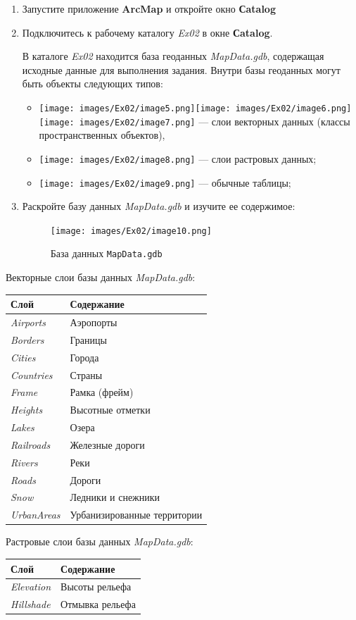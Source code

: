 \documentclass[12pt,]{book}
\providecommand{\tightlist}{%
  \setlength{\itemsep}{0pt}\setlength{\parskip}{0pt}}
\begin{document}
\begin{enumerate}
\def\labelenumi{\arabic{enumi}.}
\item
  Запустите приложение \textbf{ArcMap} и откройте окно \textbf{Сatalog}
\item
  Подключитесь к рабочему каталогу \emph{Ex02} в окне \textbf{Сatalog}.

  В каталоге \emph{Ex02} находится база геоданных \emph{MapData.gdb}, содержащая исходные данные для выполнения задания. Внутри базы геоданных могут быть объекты следующих типов:

  \begin{itemize}
  \tightlist
  \item
    \texttt{[image: images/Ex02/image5.png]}\texttt{[image: images/Ex02/image6.png]}\texttt{[image: images/Ex02/image7.png]} --- слои векторных данных (классы пространственных объектов),
  \item
    \texttt{[image: images/Ex02/image8.png]} --- слои растровых данных;
  \item
    \texttt{[image: images/Ex02/image9.png]} --- обычные таблицы;
  \end{itemize}
\item
  Раскройте базу данных \emph{MapData.gdb} и изучите ее содержимое:

  \begin{figure}
  \centering
  \texttt{[image: images/Ex02/image10.png]}
  \caption{База данных \texttt{MapData.gdb}}
  \end{figure}
\end{enumerate}

Векторные слои базы данных \emph{MapData.gdb}:

\begin{longtable}[]{@{}ll@{}}
\toprule
Слой & Содержание\tabularnewline
\midrule
\endhead
\emph{Airports} & Аэропорты\tabularnewline
\emph{Borders} & Границы\tabularnewline
\emph{Cities} & Города\tabularnewline
\emph{Countries} & Страны\tabularnewline
\emph{Frame} & Рамка (фрейм)\tabularnewline
\emph{Heights} & Высотные отметки\tabularnewline
\emph{Lakes} & Озера\tabularnewline
\emph{Railroads} & Железные дороги\tabularnewline
\emph{Rivers} & Реки\tabularnewline
\emph{Roads} & Дороги\tabularnewline
\emph{Snow} & Ледники и снежники\tabularnewline
\emph{UrbanAreas} & Урбанизированные территории\tabularnewline
\bottomrule
\end{longtable}

Растровые слои базы данных \emph{MapData.gdb}:

\begin{longtable}[]{@{}ll@{}}
\toprule
Слой & Содержание\tabularnewline
\midrule
\endhead
\emph{Elevation} & Высоты рельефа\tabularnewline
\emph{Hillshade} & Отмывка рельефа\tabularnewline
\bottomrule
\end{longtable}
\end{document}
